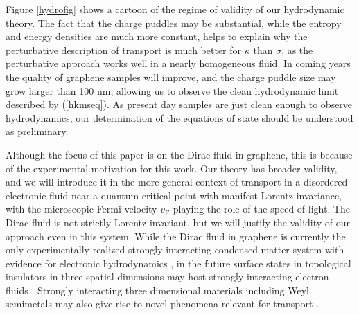 \documentclass[10pt, oneside]{book}
\begin{document}
\begin{doublespace}
Figure \ref{hydrofig} shows a cartoon of the regime of validity of our hydrodynamic theory.   The fact that the charge puddles may be substantial, while the entropy and energy densities are much more constant,  helps to explain why the perturbative description of transport is much better for $\kappa$ than $\sigma$,  as the perturbative approach works well in a nearly homogeneous fluid.  In coming years the quality of graphene samples will improve, and the charge puddle size may grow larger than 100 nm, allowing us to observe the clean hydrodynamic limit described by (\ref{hkmseq}).   As present day samples are just clean enough to observe hydrodynamics, our determination of the equations of state should be understood as preliminary.




Although the focus of this paper is on the Dirac fluid in graphene, this is because of the experimental motivation for this work.   Our theory has broader validity, and we will introduce it in the more general context of transport in a disordered electronic fluid near a quantum critical point with manifest Lorentz invariance, with the microscopic Fermi velocity $v_{\mathrm{F}}$ playing the role of the speed of light.  The Dirac fluid is not strictly Lorentz invariant, but we will justify the validity of our approach even in this system.   While the Dirac fluid in graphene is currently the only experimentally realized strongly interacting condensed matter system with evidence for electronic hydrodynamics \cite{Crossno1058},  in the future surface states in topological insulators in three spatial dimensions  may host strongly interacting electron fluids \cite{galitski}.  Strongly interacting three dimensional materials including Weyl semimetals \cite{soljacic, syxu, bqlv} may also give rise to novel phenomena relevant for transport \cite{nielsen, spivakson}.


\end{doublespace}
\end{document}
